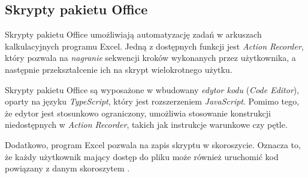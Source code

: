 \subsection{Skrypty pakietu Office }
Skrypty pakietu Office umożliwiają automatyzację zadań w arkuszach kalkulacyjnych programu Excel. Jedną z dostępnych funkcji jest \emph{Action Recorder}, który pozwala na \emph{nagranie} sekwencji kroków wykonanych przez użytkownika, a następnie przekształcenie ich na skrypt wielokrotnego użytku.\par
Skrypty pakietu Office są wyposażone w wbudowany \emph{edytor kodu} (\emph{Code Editor}), oparty na języku \emph{TypeScript}, który jest rozszerzeniem \emph{JavaScript}. Pomimo tego, że edytor jest stosunkowo ograniczony, umożliwia stosowanie konstrukcji niedostępnych w \emph{Action Recorder}, takich jak instrukcje warunkowe czy pętle.\par
Dodatkowo, program Excel pozwala na zapis skryptu w skoroszycie. Oznacza to, że każdy użytkownik mający dostęp do pliku może również uruchomić kod powiązany z danym skoroszytem \texorpdfstring{\cite{o365devx_office_2023}}{}.